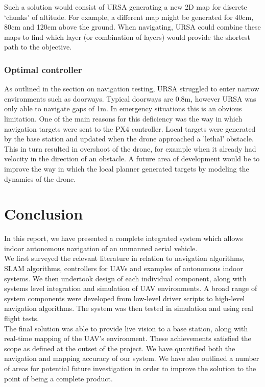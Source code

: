 \documentclass[capstone_report.tex]{subfiles}
\begin{document}
Such a solution would consist of URSA generating a new 2D map for discrete `chunks' of altitude. For example, a different map might be generated for 40cm, 80cm and 120cm above the ground. When navigating, URSA could combine these maps to find which layer (or combination of layers) would provide the shortest path to the objective.\\

\subsubsection{Optimal controller}
As outlined in the section on navigation testing, URSA struggled to enter narrow environments such as doorways.  Typical doorways are 0.8m, however URSA was only able to navigate gaps of 1m.  In emergency situations this is an obvious limitation.  One of the main reasons for this deficiency was the way in which navigation targets were sent to the PX4 controller.  Local targets were generated by the base station and updated when the drone approached a 'lethal' obstacle.  This in turn resulted in overshoot of the drone, for example when it already had velocity in the direction of an obstacle.  A future area of development would be to improve the way in which the local planner generated targets by modeling the dynamics of the drone.


\section{Conclusion}
In this report, we have presented a complete integrated system which allows indoor autonomous navigation of an unmanned aerial vehicle.\\

We first surveyed the relevant literature in relation to navigation algorithms, SLAM algorithms, controllers for UAVs and examples of autonomous indoor systems.  We then undertook design of each individual component, along with systems level integration and simulation of UAV environments. A broad range of system components were developed from low-level driver scripts to high-level navigation algorithms.  The system was then tested in simulation and using real flight tests.\\

The final solution was able to provide live vision to a base station, along with real-time mapping of the UAV's environment.  These achievements satisfied the scope as defined at the outset of the project.  We have quantified both the navigation and mapping accuracy of our system. We have also outlined a number of areas for potential future investigation in order to improve the solution to the point of being a complete product.
\end{document}
